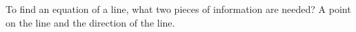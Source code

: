 {To find an equation of a line, what two pieces of information are needed?
}
{A point on the line and the direction of the line.
}

